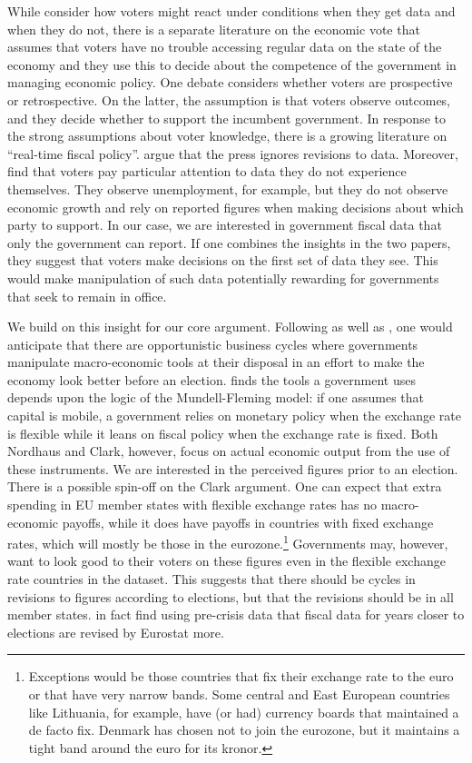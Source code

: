 \documentclass[]{article}
\begin{document}
While \cite{Hollyer2014} consider how voters might react under conditions when they get data and when they do not, there is a separate literature on the economic vote that assumes that voters have no trouble accessing regular data on the state of the economy and they use this to decide about the competence of the government in managing economic policy. One debate considers whether voters are prospective or retrospective. On the latter, the assumption is that voters observe outcomes, and they decide whether to support the incumbent government. In response to the strong assumptions about voter knowledge, there is a growing literature on ``real-time fiscal policy''. \cite{KayserLeininger2015} argue that the press ignores revisions to data. Moreover, \cite{kayser_peress} find that voters pay particular attention to data they do not experience themselves. They observe unemployment, for example, but they do not observe economic growth and rely on reported figures when making decisions about which party to support. In our case, we are interested in government fiscal data that only the government can report. If one combines the insights in the two papers, they suggest that voters make decisions on the first set of data they see. This would make manipulation of such data potentially rewarding for governments that seek to remain in office.

We build on this insight for our core argument. Following \cite{nordhaus1975} as well as \cite{Alt2014}, one would anticipate that there are opportunistic business cycles where governments manipulate macro-economic tools at their disposal in an effort to make the economy look better before an election. \cite{clark2003} finds the tools a government uses depends upon the logic of the Mundell-Fleming model: if one assumes that capital is mobile, a government relies on monetary policy when the exchange rate is flexible while it leans on fiscal policy when the exchange rate is fixed. Both Nordhaus and Clark, however, focus on actual economic output from the use of these instruments. We are interested in the perceived figures prior to an election. There is a possible spin-off on the Clark argument. One can expect that extra spending in EU member states with flexible exchange rates has no macro-economic payoffs, while it does have payoffs in countries with fixed exchange rates, which will mostly be those in the eurozone.\footnote{Exceptions would be those countries that fix their exchange rate to the euro or that have very narrow bands. Some central and East European countries like Lithuania, for example, have (or had) currency boards that maintained a de facto fix. Denmark has chosen not to join the eurozone, but it maintains a tight band around the euro for its kronor.} Governments may, however, want to look good to their voters on these figures even in the flexible exchange rate countries in the dataset. This suggests that there should be cycles in revisions to figures according to elections, but that the revisions should be in all member states. \cite{DeCastro2013} in fact find using pre-crisis data that fiscal data for years closer to elections are revised by Eurostat more.
\end{document}

